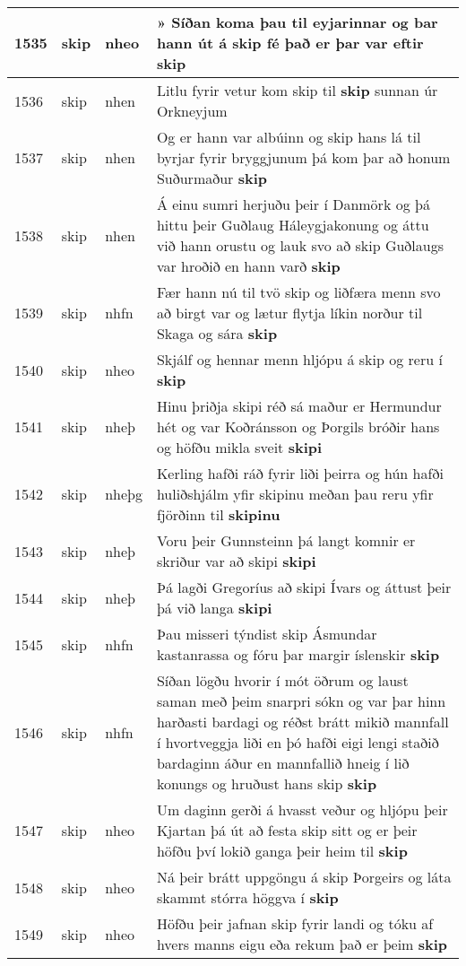 \documentclass{article}
\begin{document}
\begin{longtable}{p{1cm}|p{1cm}|p{1cm}|p{13cm}}
\hline
1535&skip&nheo&» Síðan koma þau til eyjarinnar og bar hann út á skip fé það er þar var eftir \textbf{skip} \\
\hline
1536&skip&nhen&Litlu fyrir vetur kom skip til \textbf{skip} sunnan úr Orkneyjum\\
\hline
1537&skip&nhen&Og er hann var albúinn og skip hans lá til byrjar fyrir bryggjunum þá kom þar að honum Suðurmaður \textbf{skip} \\
\hline
1538&skip&nhen&Á einu sumri herjuðu þeir í Danmörk og þá hittu þeir Guðlaug Háleygjakonung og áttu við hann orustu og lauk svo að skip Guðlaugs var hroðið en hann varð \textbf{skip} \\
\hline
1539&skip&nhfn&Fær hann nú til tvö skip og liðfæra menn svo að birgt var og lætur flytja líkin norður til Skaga og sára \textbf{skip} \\
\hline
1540&skip&nheo&Skjálf og hennar menn hljópu á skip og reru í \textbf{skip} \\
\hline
1541&skip&nheþ&Hinu þriðja skipi réð sá maður er Hermundur hét og var Koðránsson og Þorgils bróðir hans og höfðu mikla sveit \textbf{skipi} \\
\hline
1542&skip&nheþg&Kerling hafði ráð fyrir liði þeirra og hún hafði huliðshjálm yfir skipinu meðan þau reru yfir fjörðinn til \textbf{skipinu} \\
\hline
1543&skip&nheþ&Voru þeir Gunnsteinn þá langt komnir er skriður var að skipi \textbf{skipi} \\
\hline
1544&skip&nheþ&Þá lagði Gregoríus að skipi Ívars og áttust þeir þá við langa \textbf{skipi} \\
\hline
1545&skip&nhfn&Þau misseri týndist skip Ásmundar kastanrassa og fóru þar margir íslenskir \textbf{skip} \\
\hline
1546&skip&nhfn&Síðan lögðu hvorir í mót öðrum og laust saman með þeim snarpri sókn og var þar hinn harðasti bardagi og réðst brátt mikið mannfall í hvortveggja liði en þó hafði eigi lengi staðið bardaginn áður en mannfallið hneig í lið konungs og hruðust hans skip \textbf{skip} \\
\hline
1547&skip&nheo&Um daginn gerði á hvasst veður og hljópu þeir Kjartan þá út að festa skip sitt og er þeir höfðu því lokið ganga þeir heim til \textbf{skip} \\
\hline
1548&skip&nheo&Ná þeir brátt uppgöngu á skip Þorgeirs og láta skammt stórra höggva í \textbf{skip} \\
\hline
1549&skip&nheo&Höfðu þeir jafnan skip fyrir landi og tóku af hvers manns eigu eða rekum það er þeim \textbf{skip} \\

\end{longtable}
\end{document}
